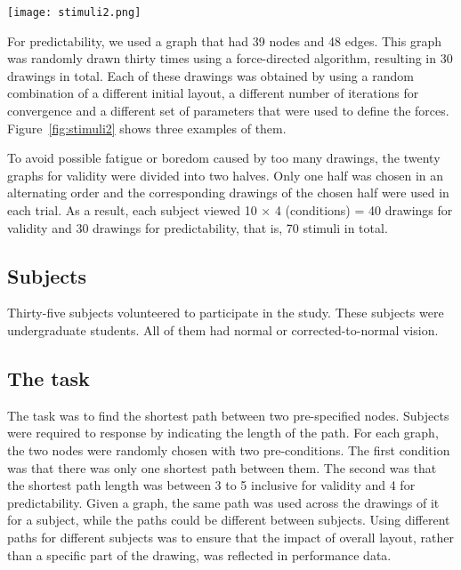 \documentclass[conference,letterpaper]{IEEEtran}
\begin{document}
\begin{figure*}[t]
\centering
\texttt{[image: stimuli2.png]}
\caption{Three examples of the thirty drawings of a graph for predictability} \label{fig:stimuli2}
\end{figure*}


For predictability, we used a graph that had 39 nodes and 48 edges. This graph was randomly drawn thirty times using a force-directed algorithm, resulting in 30 drawings in total. Each of these drawings was obtained by using a random combination of a different initial layout, a different number of iterations for convergence and a different set of parameters that were used to define the forces. Figure~\ref{fig:stimuli2} shows three examples of them.


 



To avoid possible fatigue or boredom caused by too many drawings, the twenty graphs for validity were divided into two halves. Only one half was chosen in an alternating order and the corresponding drawings of the chosen half were used in each trial. As a result, each subject viewed 10 $\times$ 4 (conditions) = 40 drawings for validity and 30 drawings for predictability, that is, 70 stimuli in total.


\subsection{Subjects}


Thirty-five subjects volunteered to participate in the study. These subjects were undergraduate students. All of them had normal or corrected-to-normal vision. 


\subsection{The task}


The task was to find the shortest path between two pre-specified nodes. Subjects were required to response by indicating the length of the path. For each graph, the two nodes were randomly chosen with two pre-conditions. The first condition was that there was only one shortest path between them. The second was that the shortest path length was between 3 to 5 inclusive for validity and 4 for predictability. Given a graph, the same path was used across the drawings of it for a subject, while the paths could be different between subjects. Using different paths for different subjects was to ensure that the impact of overall layout, rather than a specific part of the drawing, was reflected in performance data.
\end{document}
